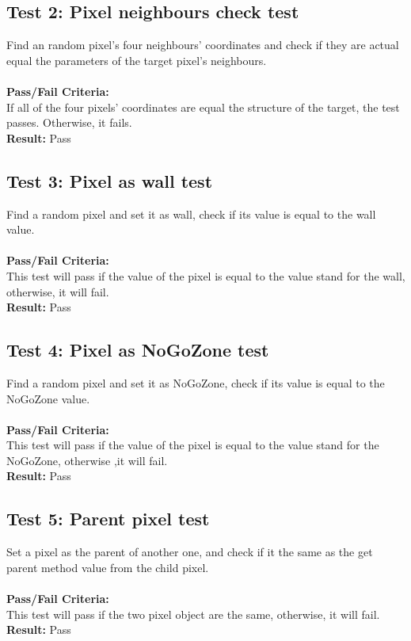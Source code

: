 \documentclass[11pt, a4paper]{report}
\begin{document}
\subsection {Test 2: Pixel neighbours check test}
Find an random pixel's four neighbours' coordinates and check if they are actual equal the parameters of the target pixel's neighbours.\\\\
\noindent\textbf{Pass/Fail Criteria:\\}
If all of the four pixels' coordinates are equal the structure of the target, the test passes. Otherwise, it fails.\\
\noindent\textbf{Result: }Pass

\subsection {Test 3: Pixel as wall test}
Find a random pixel and set it as wall, check if its value is equal to the wall value.\\\\
\noindent\textbf{Pass/Fail Criteria:\\}
This test will pass if the value of the pixel is equal to the value stand for the wall, otherwise, it will fail.\\
\noindent\textbf{Result: }Pass

\subsection {Test 4: Pixel as NoGoZone test}
Find a random pixel and set it as NoGoZone, check if its value is equal to the NoGoZone value.\\\\
\noindent\textbf{Pass/Fail Criteria:\\}
This test will pass if the value of the pixel is equal to the value stand for the NoGoZone, otherwise ,it will fail.\\
\noindent\textbf{Result: }Pass

\subsection {Test 5: Parent pixel test}
Set a pixel as the parent of another one, and check if it the same as the get parent method value from the child pixel.\\\\
\noindent\textbf{Pass/Fail Criteria:\\}
This test will pass if the two pixel object are the same, otherwise, it will fail.\\
\noindent\textbf{Result: }Pass
\end{document}
